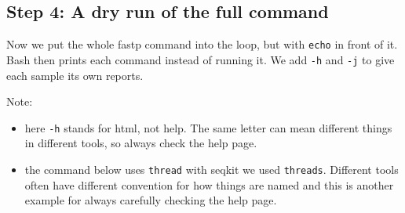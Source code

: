 \documentclass[
  letterpaper,
  DIV=11,
  numbers=noendperiod]{scrreprt}
\newenvironment{Shaded}{}{}
\newcommand{\AttributeTok}[1]{\textcolor[rgb]{0.84,0.23,0.29}{#1}}
\newcommand{\BuiltInTok}[1]{\textcolor[rgb]{0.84,0.23,0.29}{#1}}
\newcommand{\CommentTok}[1]{\textcolor[rgb]{0.42,0.45,0.49}{#1}}
\newcommand{\ControlFlowTok}[1]{\textcolor[rgb]{0.84,0.23,0.29}{#1}}
\newcommand{\DataTypeTok}[1]{\textcolor[rgb]{0.84,0.23,0.29}{#1}}
\newcommand{\FunctionTok}[1]{\textcolor[rgb]{0.44,0.26,0.76}{#1}}
\newcommand{\KeywordTok}[1]{\textcolor[rgb]{0.84,0.23,0.29}{#1}}
\newcommand{\NormalTok}[1]{\textcolor[rgb]{0.14,0.16,0.18}{#1}}
\newcommand{\PreprocessorTok}[1]{\textcolor[rgb]{0.84,0.23,0.29}{#1}}
\newcommand{\StringTok}[1]{\textcolor[rgb]{0.01,0.18,0.38}{#1}}
\newcommand{\VariableTok}[1]{\textcolor[rgb]{0.89,0.38,0.04}{#1}}
\providecommand{\tightlist}{%
  \setlength{\itemsep}{0pt}\setlength{\parskip}{0pt}}
\begin{document}
\subsection{Step 4: A dry run of the full
command}\label{step-4-a-dry-run-of-the-full-command}

Now we put the whole fastp command into the loop, but with \texttt{echo}
in front of it. Bash then prints each command instead of running it. We
add \texttt{-h} and \texttt{-j} to give each sample its own reports.

Note:

\begin{itemize}
\tightlist
\item
  here \texttt{-h} stands for html, not help. The same letter can mean
  different things in different tools, so always check the help page.
\item
  the command below uses \texttt{thread} with seqkit we used
  \texttt{threads}. Different tools often have different convention for
  how things are named and this is another example for always carefully
  checking the help page.
\end{itemize}

\begin{Shaded}
\end{Shaded}
\end{document}
